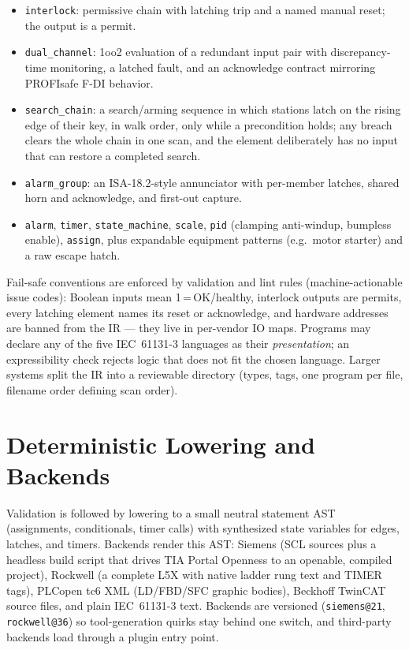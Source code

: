 \documentclass[letterpaper]{jacow}
\begin{document}
\begin{itemize}
\item \texttt{interlock}: permissive chain with latching trip and a
  named manual reset; the output is a permit.
\item \texttt{dual\_channel}: 1oo2 evaluation of a redundant input pair
  with discrepancy-time monitoring, a latched fault, and an
  acknowledge contract mirroring PROFIsafe F-DI behavior.
\item \texttt{search\_chain}: a search/arming sequence in which
  stations latch on the rising edge of their key, in walk order, only
  while a precondition holds; any breach clears the whole chain in one
  scan, and the element deliberately has no input that can restore a
  completed search.
\item \texttt{alarm\_group}: an ISA-18.2-style annunciator with
  per-member latches, shared horn and acknowledge, and first-out
  capture.
\item \texttt{alarm}, \texttt{timer}, \texttt{state\_machine},
  \texttt{scale}, \texttt{pid} (clamping anti-windup, bumpless
  enable), \texttt{assign}, plus expandable equipment patterns
  (e.g.\ motor starter) and a raw escape hatch.
\end{itemize}

Fail-safe conventions are enforced by validation and lint rules
(machine-actionable issue codes): Boolean inputs mean
1\,=\,OK/healthy, interlock outputs are permits, every latching
element names its reset or acknowledge, and hardware addresses are
banned from the IR --- they live in per-vendor IO maps. Programs may
declare any of the five IEC~61131-3 languages as their
\emph{presentation}; an expressibility check rejects logic that does
not fit the chosen language. Larger systems split the IR into a
reviewable directory (types, tags, one program per file, filename
order defining scan order).

\section{Deterministic Lowering and Backends}

Validation is followed by lowering to a small neutral statement AST
(assignments, conditionals, timer calls) with synthesized state
variables for edges, latches, and timers. Backends render this AST:
Siemens (SCL sources plus a headless build script that drives TIA
Portal Openness to an openable, compiled project), Rockwell (a
complete L5X with native ladder rung text and TIMER tags), PLCopen
tc6 XML (LD/FBD/SFC graphic bodies), Beckhoff TwinCAT source files,
and plain IEC~61131-3 text. Backends are versioned
(\texttt{siemens@21}, \texttt{rockwell@36}) so tool-generation quirks
stay behind one switch, and third-party backends load through a
plugin entry point.
\end{document}
